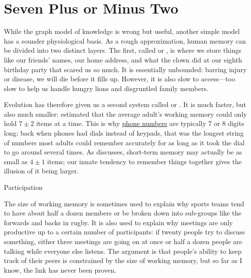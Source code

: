 \section{Seven Plus or Minus Two}\label{s:memory-seven-plus-or-minus}

While the graph model of knowledge is wrong but useful, another simple
model has a sounder physiological basis. As a rough approximation,
human memory can be divided into two distinct layers. The first,
called  or
, is where we store
things like our friends' names, our home address, and what the clown
did at our eighth birthday party that scared us so much. It is
essentially unbounded: barring injury or disease, we will die before
it fills up. However, it is also slow to access---too slow to help us
handle hungry lions and disgruntled family members.

Evolution has therefore given us a second system called
 or
. It is much faster, but
also much smaller: \cite{Mill1956} estimated that the average adult's
working memory could only hold $7{\pm}2$ items at a time. This is why
\href{https://www.quora.com/Why-did-Bell-Labs-create-phone-numbers-of-7-digits-10-digits-Is-there-a-reason-that-dashes-and-brackets-are-used}{phone
  numbers} are typically 7 or 8 digits long: back when phones had
dials instead of keypads, that was the longest string of numbers most
adults could remember accurately for as long as it took the dial to go
around several times.  As  discusses,
short-term memory may actually be as small as $4{\pm}1$ items; our
innate tendency to remember things together gives the illusion of it
being larger.

\begin{callout}{Participation}

  The size of working memory is sometimes used to explain why sports
  teams tend to have about half a dozen members or be broken down into
  sub-groups like the forwards and backs in rugby.  It is also used to
  explain why meetings are only productive up to a certain number of
  participants: if twenty people try to discuss something, either
  three meetings are going on at once or half a dozen people are
  talking while everyone else listens.  The argument is that people's
  ability to keep track of their peers is constrained by the size of
  working memory, but so far as I know, the link has never been
  proven.

\end{callout}

